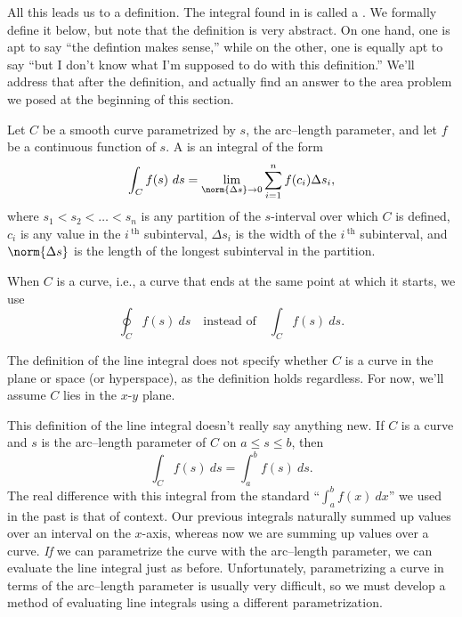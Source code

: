 All this leads us to a definition. The integral found in  is called a . We formally define it below, but note that the definition is very abstract. On one hand, one is apt to say ``the defintion makes sense,'' while on the other, one is equally apt to say ``but I don't know what I'm supposed to do with this definition.'' We'll address that after the definition, and actually find an answer to the area problem we posed at the beginning of this section.


{Let $C$ be a smooth curve parametrized by $s$, the arc--length parameter, and let $f$ be a continuous function of $s$. A  is an integral of the form
\[\int_C f(s)\ ds = \lim_{\norm{\Delta s}\to 0}\sum_{i=1}^n f(c_i)\Delta s_i,\]
where $s_1<s_2<\ldots<s_n$ is any partition of the $s$-interval over which $C$ is defined, $c_i$ is any value in the $i\,^\text{th}$ subinterval,  $\Delta s_i$ is the width of the $i\,^\text{th}$ subinterval, and $\norm{\Delta s}$ is the length of the longest subinterval in the partition.}

When $C$ is a  curve, i.e., a curve that ends at the same point at which it starts,  we use
\[\oint_C f(s)\ ds \quad \text{instead of}\quad \int_Cf(s)\ ds.\]

The definition of the line integral does not specify whether $C$ is a curve in the plane or space (or hyperspace), as the definition holds regardless. For now, we'll assume $C$ lies in the $x$-$y$ plane.

This definition of the line integral  doesn't really say anything new. If $C$ is a curve and $s$ is the arc--length parameter of $C$ on $a\leq s\leq b$, then 
\[\int_Cf(s)\ ds = \int_a^bf(s)\ ds.\]
The real difference with this integral from the standard ``$\int_a^bf(x)\ dx$'' we used in the past is that of context. Our previous integrals naturally summed up values over an interval on the $x$-axis, whereas now we are summing up values over a curve. \emph{If} we can parametrize the curve with the arc--length parameter, we can evaluate the line integral just as before. Unfortunately, parametrizing a curve in terms of the arc--length parameter is usually very difficult, so we must develop a method of evaluating line integrals using a different parametrization.

